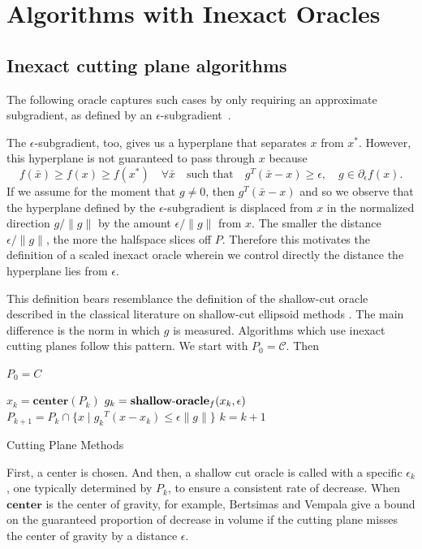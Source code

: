 \section{Algorithms with Inexact Oracles}


\subsection{Inexact cutting plane algorithms}

The following oracle captures such cases by only requiring an approximate
subgradient, as defined by an
$\epsilon$-subgradient~\cite[p.~219]{Roc70}.

The $\epsilon$-subgradient, too, gives us a hyperplane that separates
$x$ from $x^*$. However, this hyperplane is not guaranteed to pass
through $x$ because
\[
f(\bar{x})\geq f(x) \geq f(x^*) \quad\forall \bar{x} \quad \text{such that} \quad g^T(\bar{x}-x)\geq\epsilon, \quad g \in \partial_\epsilon f(x).
\]
If we assume for the moment that $g\ne0$, then $g^T(\bar{x}-x)$
and so we observe that the hyperplane defined by the
$\epsilon$-subgradient is displaced from $x$ in the normalized
direction $g/\|g\|$ by the amount $\epsilon/\|g\|$ from $x$. The
smaller the distance $\epsilon/\|g\|$, the more the halfspace slices
off $P$. Therefore this motivates the definition of a scaled inexact
oracle wherein we control directly the distance the hyperplane lies
from $\epsilon$.

This definition bears resemblance the definition of the shallow-cut
oracle described in the classical literature on shallow-cut ellipsoid
methods \cite{bland1981ellipsoid,grotschel2012geometric}. The main
difference is the norm in which $g$ is measured. Algorithms which use
inexact cutting planes follow this pattern. We start with
$P_0 = \mathcal{C}$. Then
\begin{algorithm} 
  \SetAlgoNoLine
  \DontPrintSemicolon
  $P_0 = C$\;
  
   {
  \nl $x_{k}  = \mathbf{center}(P_k)$\;
  \nl $g_{k}  = \mbox{{\bf shallow}-{\bf oracle}}_f(x_{k}, \epsilon)$\;
  \nl $P_{k+1} = P_k \cap \{x \mid {g_k}^T({x -x_k}) \leq \epsilon\|g\|\}$\;
  \nl $k = k + 1$
  }
  \caption{Cutting Plane Methods \label{alg:shallow_cutting_plane}}
\end{algorithm}
First, a center is chosen. And then, a shallow cut oracle is called
with a specific $\epsilon_k$, one typically determined by $P_k$, to
ensure a consistent rate of decrease. When $\mathbf{center}$ is the
center of gravity, for example, Bertsimas and Vempala
\cite[Theorem~3]{bertsimas2004solving} give a bound on the guaranteed
proportion of decrease in volume if the cutting plane misses the
center of gravity by a distance $\epsilon$.


